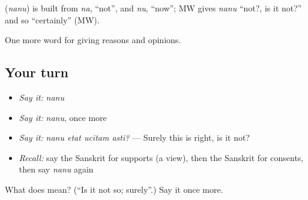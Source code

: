 \begin{cousinweb}
\textbf{} (\emph{nanu}) is built from \emph{na}, \textquotedblleft{}not\textquotedblright{}, and \emph{nu}, \textquotedblleft{}now\textquotedblright{}; MW gives \emph{nanu} \textquotedblleft{}not?, is it not?\textquotedblright{} and so \textquotedblleft{}certainly\textquotedblright{} (MW).
\end{cousinweb}

\begin{grammarlens}[title={What you've built}]
One more word for giving reasons and opinions.
\end{grammarlens}

\subsection*{Your turn}
\begin{itemize}
\raggedright
  \item \emph{Say it:} \emph{nanu}
  \item \emph{Say it:} \emph{nanu}, once more
  \item \emph{Say it:} \emph{nanu etat ucitam asti?} — Surely this is right, is it not?
  \item \emph{Recall:} say the Sanskrit for supports (a view), then the Sanskrit for consents, then say \emph{nanu} again
\end{itemize}

\begin{tcolorbox}[breakable,colback=teal!4,colframe=teal!35!black,title={Before you move on}]
What does  mean? (\textquotedblleft{}Is it not so; surely\textquotedblright{}.) Say it once more.
\end{tcolorbox}

